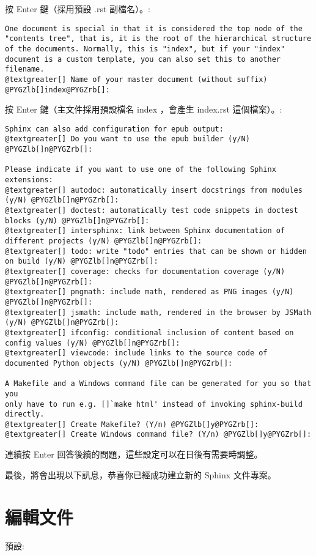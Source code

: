 \documentclass[a4paper,12pt,english]{sphinxmanual}
\begin{document}
按 Enter 鍵（採用預設 .rst 副檔名）。:

\begin{Verbatim}[commandchars=@\[\]]
One document is special in that it is considered the top node of the
"contents tree", that is, it is the root of the hierarchical structure
of the documents. Normally, this is "index", but if your "index"
document is a custom template, you can also set this to another filename.
@textgreater[] Name of your master document (without suffix) @PYGZlb[]index@PYGZrb[]:
\end{Verbatim}

按 Enter 鍵（主文件採用預設檔名 index ，會產生 index.rst 這個檔案）。:

\begin{Verbatim}[commandchars=@\[\]]
Sphinx can also add configuration for epub output:
@textgreater[] Do you want to use the epub builder (y/N) @PYGZlb[]n@PYGZrb[]:

Please indicate if you want to use one of the following Sphinx extensions:
@textgreater[] autodoc: automatically insert docstrings from modules (y/N) @PYGZlb[]n@PYGZrb[]:
@textgreater[] doctest: automatically test code snippets in doctest blocks (y/N) @PYGZlb[]n@PYGZrb[]:
@textgreater[] intersphinx: link between Sphinx documentation of different projects (y/N) @PYGZlb[]n@PYGZrb[]:
@textgreater[] todo: write "todo" entries that can be shown or hidden on build (y/N) @PYGZlb[]n@PYGZrb[]:
@textgreater[] coverage: checks for documentation coverage (y/N) @PYGZlb[]n@PYGZrb[]:
@textgreater[] pngmath: include math, rendered as PNG images (y/N) @PYGZlb[]n@PYGZrb[]:
@textgreater[] jsmath: include math, rendered in the browser by JSMath (y/N) @PYGZlb[]n@PYGZrb[]:
@textgreater[] ifconfig: conditional inclusion of content based on config values (y/N) @PYGZlb[]n@PYGZrb[]:
@textgreater[] viewcode: include links to the source code of documented Python objects (y/N) @PYGZlb[]n@PYGZrb[]:

A Makefile and a Windows command file can be generated for you so that you
only have to run e.g. []`make html' instead of invoking sphinx-build
directly.
@textgreater[] Create Makefile? (Y/n) @PYGZlb[]y@PYGZrb[]:
@textgreater[] Create Windows command file? (Y/n) @PYGZlb[]y@PYGZrb[]:
\end{Verbatim}

連續按 Enter 回答後續的問題，這些設定可以在日後有需要時調整。

最後，將會出現以下訊息，恭喜你已經成功建立新的 Sphinx 文件專案。


\section{編輯文件}
\label{sphinx_firstlook::doc}\label{sphinx_firstlook:id1}
預設:
\end{document}
